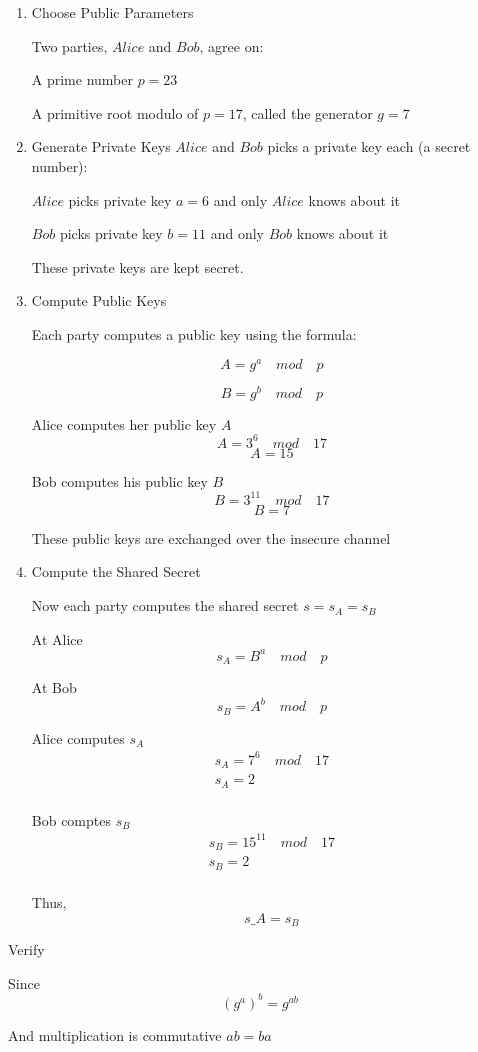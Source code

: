 \documentclass[a4paper, 9pt, english]{article}
\begin{document}
\begin{enumerate}
\item { Choose Public Parameters}

Two parties, $Alice$ and $Bob$, agree on:

A prime number $p =23 $

A primitive root modulo of $p = 17$, called the generator $g = 7$


\item { Generate Private Keys}
 $Alice$ and $Bob$ picks a private key each (a secret number):

 $Alice$ picks  private key $a = 6$ and only  $Alice$ knows about it
 
  $Bob$ picks  private key $b = 11$ and   only $Bob$ knows about it

These private keys are kept secret.

\item {Compute Public Keys}

Each party computes a public key using the formula:

\begin{equation}
A = g^a \quad mod \quad  p\label{eq:alice_public}
\end{equation}

\begin{equation}
B= g^b \quad mod  \quad p\label{eq:bob_public}
\end{equation}

Alice computes her public key $A$
$$A = 3^6 \quad mod \quad  17 $$
$$A = 15 $$

Bob computes his public key $B$
$$B = 3^{11} \quad mod \quad  17 $$
$$B = 7 $$

These public keys are exchanged over the insecure channel

\item { Compute the Shared Secret}

Now each party computes the shared secret $s = s_A = s_B$

At Alice
\begin{equation}
s_A= B^a \quad mod  \quad p\label{eq:alice_s_a}
\end{equation}

At Bob
\begin{equation}
s_B= A^b \quad mod  \quad p\label{eq:bob_s_b}
\end{equation}

Alice computes $s_A$
\begin{gather*}
    s_A = 7^6 \quad mod \quad 17\\
    s_A = 2\\
\end{gather*}

Bob comptes $s_B$
\begin{gather*}
    s_B = 15^{11} \quad mod \quad 17\\
    s_B = 2\\
\end{gather*}

Thus, \[s\_A = s_B \]

\end{enumerate}

{\Large Verify}

{\textsf Since } $$(g^a)^b = g^{ab}$$

\textsf{And multiplication is commutative} ${ab = ba}$


\end{document}
